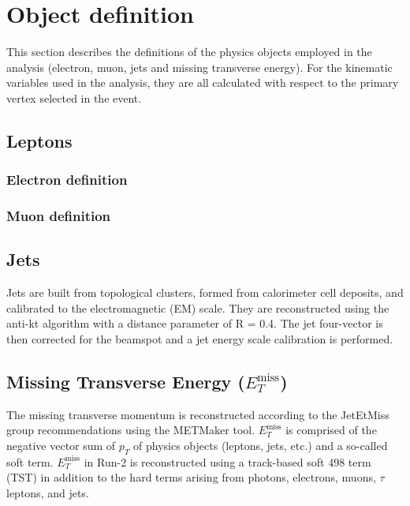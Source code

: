 \section{Object definition}
\label{sec:objectdef}

This section describes the definitions of the physics objects employed in the analysis (electron, muon, jets and missing transverse energy). For the kinematic variables used in the analysis, they are all calculated with respect to the primary vertex selected in the event.

\subsection{Leptons}

\subsubsection{Electron definition}

\subsubsection{Muon definition}

\subsection{Jets}
Jets are built from topological clusters, formed from calorimeter cell deposits, and calibrated to the electromagnetic (EM) scale. They are reconstructed using the anti-kt algorithm with a distance parameter of R = 0.4. The jet four-vector is then corrected for the beamspot and a jet energy scale calibration is performed.

\subsection{Missing Transverse Energy ($E_T^{\mbox{miss}}$)}
The missing transverse momentum is reconstructed according to the JetEtMiss group recommendations using the METMaker tool\cite{MET-Utilities}. $E^{\mbox{miss}}_T$ is comprised of the negative vector sum of $p_T$ of physics objects (leptons, jets, etc.) and a so-called soft term. $E^{\mbox{miss}}_T$ in Run-2 is reconstructed using a track-based soft 498 term (TST)\cite{ATL-PHYS-PUB-2015-027} in addition to the hard terms arising from photons, electrons, muons, $\tau$ leptons, and jets.